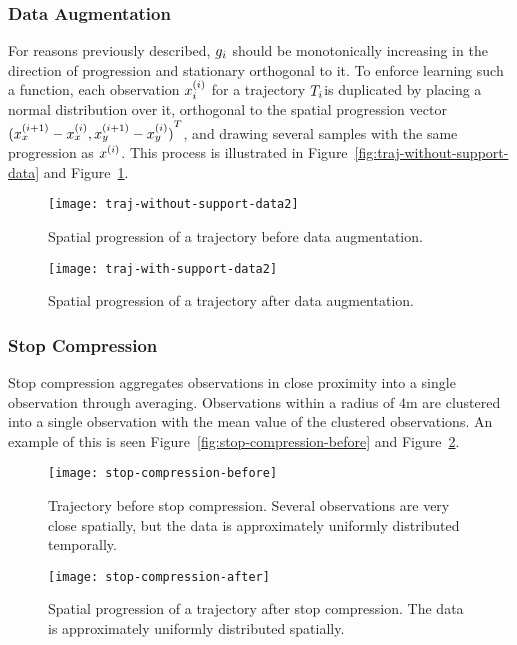 \subsubsection{Data Augmentation}
\label{sec:data-augmentation}
For reasons previously described, $g_{i}$ should be monotonically increasing in
the direction of progression and stationary orthogonal to it.
To enforce learning such a function, each
observation $x_{i}^{(i)}$ for a trajectory $T_{i}$is duplicated by placing a normal distribution
over it, orthogonal to the spatial progression vector ${(x^{(i+1)}_x -
  x^{(i)}_x, x^{(i+1)}_y - x^{(i)}_y)}^T$, and drawing several samples
with the same progression as $x^{(i)}$. This process is illustrated in
Figure~\ref{fig:traj-without-support-data} and
Figure~\ref{fig:traj-with-support-data}.
\begin{figure}
  \begin{minipage}{.46\textwidth}
    \texttt{[image: traj-without-support-data2]}
    \caption{Spatial progression of a trajectory
      before data augmentation.}\label{fig:traj-without-support-data}
  \end{minipage}
  \hspace{5pt}
  \begin{minipage}{.46\textwidth}
    \texttt{[image: traj-with-support-data2]}
    \caption{Spatial progression of a trajectory
      after data augmentation. }\label{fig:traj-with-support-data}
  \end{minipage}
\end{figure}

\subsubsection{Stop Compression}
\label{sec:stop-compression}
Stop compression aggregates observations in close proximity into a
single observation through averaging. Observations within a radius of
$4$m are clustered into a single observation with the mean value of
the clustered observations. An example of this is seen
Figure~\ref{fig:stop-compression-before} and Figure~\ref{fig:stop-compression-after}.
\begin{figure}
  \begin{minipage}{.46\textwidth}
    \texttt{[image: stop-compression-before]}
    \caption{Trajectory before stop compression. Several observations
      are very close spatially, but the data is
      approximately uniformly distributed temporally. }\label{fig:stop-compression-before}
  \end{minipage}
  \hspace{5pt}
  \begin{minipage}{.46\textwidth}
    \texttt{[image: stop-compression-after]}
    \caption{Spatial progression of a trajectory
      after stop compression. The data is
      approximately uniformly distributed spatially.}\label{fig:stop-compression-after}
  \end{minipage}
\end{figure}

